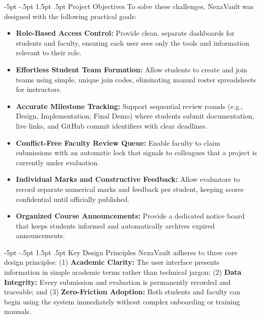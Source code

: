 \documentclass[11pt,a4paper]{article}
\makeatletter
\renewcommand\subsection{\@startsection{subsection}{2}{\z@}%
  {-5pt \@plus -1pt \@minus -.5pt}%
  {1.5pt \@plus .5pt}%
  {\normalfont\normalsize\bfseries\color{nexaSlate}}}
\makeatother
\begin{document}
\subsection{Project Objectives}
To solve these challenges, NexaVault was designed with the following practical goals:
\begin{itemize}
  \item \textbf{Role-Based Access Control:} Provide clean, separate dashboards for students and faculty, ensuring each user sees only the tools and information relevant to their role.
  \item \textbf{Effortless Student Team Formation:} Allow students to create and join teams using simple, unique join codes, eliminating manual roster spreadsheets for instructors.
  \item \textbf{Accurate Milestone Tracking:} Support sequential review rounds (e.g., Design, Implementation, Final Demo) where students submit documentation, live links, and GitHub commit identifiers with clear deadlines.
  \item \textbf{Conflict-Free Faculty Review Queue:} Enable faculty to claim submissions with an automatic lock that signals to colleagues that a project is currently under evaluation.
  \item \textbf{Individual Marks and Constructive Feedback:} Allow evaluators to record separate numerical marks and feedback per student, keeping scores confidential until officially published.
  \item \textbf{Organized Course Announcements:} Provide a dedicated notice board that keeps students informed and automatically archives expired announcements.
\end{itemize}

\subsection{Key Design Principles}
NexaVault adheres to three core design principles: (1) \textbf{Academic Clarity:} The user interface presents information in simple academic terms rather than technical jargon; (2) \textbf{Data Integrity:} Every submission and evaluation is permanently recorded and traceable; and (3) \textbf{Zero-Friction Adoption:} Both students and faculty can begin using the system immediately without complex onboarding or training manuals.

\clearpage

\end{document}
